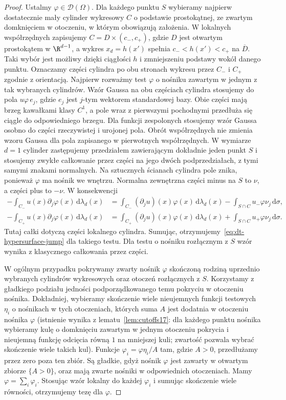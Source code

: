 \begin{proof}
Ustalmy $\varphi\in\mathcal D(\Omega)$.
Dla każdego punktu $S$ wybieramy najpierw
dostatecznie mały cylinder wykresowy $C$
o podstawie prostokątnej, ze zwartym domknięciem
w otoczeniu, w którym obowiązują założenia.
W lokalnych współrzędnych zapisujemy
$C=D\times(c_-,c_+)$, gdzie $D$ jest otwartym
prostokątem w $\R^{d-1}$, a wykres $x_d=h(x')$
spełnia $c_-<h(x')<c_+$ na $\overline D$.
Taki wybór jest możliwy dzięki ciągłości $h$
i zmniejszeniu podstawy wokół danego punktu.
Oznaczamy części cylindra po obu stronach
wykresu przez $C_-$ i $C_+$ zgodnie z orientacją.
Najpierw rozważmy test $\varphi$ o nośniku
zawartym w jednym z tak wybranych cylindrów.
Wzór Gaussa na obu częściach cylindra stosujemy
do pola $u\varphi\,e_j$, gdzie $e_j$ jest $j$-tym
wektorem standardowej bazy. Obie części mają
brzeg kawałkami klasy $C^1$, a pole wraz z pierwszymi
pochodnymi przedłuża się ciągle do odpowiedniego brzegu.
Dla funkcji zespolonych stosujemy wzór Gaussa osobno
do części rzeczywistej i urojonej pola.
Obrót współrzędnych nie zmienia wzoru Gaussa
dla pola zapisanego w pierwotnych współrzędnych.
W wymiarze $d=1$ cylinder zastępujemy przedziałem
zawierającym dokładnie jeden punkt $S$ i stosujemy
zwykłe całkowanie przez części na jego dwóch
podprzedziałach, z tymi samymi znakami normalnych.
Na sztucznych ścianach cylindra pole znika,
ponieważ $\varphi$ ma nośnik we wnętrzu.
Normalna zewnętrzna części minus na $S$ to $\nu$,
a części plus to $-\nu$. W konsekwencji
\[
 \begin{aligned}
 -\int_{C_-}u(x)\partial_j\varphi(x)\,\mathrm d\lambda_d(x)
 &=\int_{C_-}(\partial_ju)(x)\varphi(x)\,\mathrm d\lambda_d(x)
   -\int_{S\cap C} u_-\varphi\nu_j\,\mathrm d\sigma,\\
 -\int_{C_+}u(x)\partial_j\varphi(x)\,\mathrm d\lambda_d(x)
 &=\int_{C_+}(\partial_ju)(x)\varphi(x)\,\mathrm d\lambda_d(x)
   +\int_{S\cap C} u_+\varphi\nu_j\,\mathrm d\sigma.
 \end{aligned}
\]
Tutaj całki dotyczą części lokalnego cylindra.
Sumując, otrzymujemy~\eqref{eq:dt-hypersurface-jump} dla takiego
testu. Dla testu o nośniku rozłącznym z $S$ wzór
wynika z klasycznego całkowania przez części.

W ogólnym przypadku pokrywamy zwarty nośnik
$\varphi$ skończoną rodziną uprzednio wybranych
cylindrów wykresowych oraz otoczeń rozłącznych
z $S$. Korzystamy z gładkiego
podziału jedności podporządkowanego temu pokryciu
w otoczeniu nośnika. Dokładniej, wybieramy skończenie
wiele nieujemnych funkcji testowych $\eta_i$
o nośnikach w tych otoczeniach, których suma $A$
jest dodatnia w otoczeniu nośnika $\varphi$
(istnienie wynika z lematu~\ref{lem:cutoffs17}:
dla każdego punktu nośnika wybieramy kulę o domknięciu
zawartym w jednym otoczeniu pokrycia i nieujemną funkcję
odcięcia równą $1$ na mniejszej kuli; zwartość pozwala
wybrać skończenie wiele takich kul).
Funkcje $\varphi_i=\varphi\eta_i/A$ tam, gdzie $A>0$,
przedłużamy przez zero poza ten zbiór.
Są gładkie, gdyż nośnik $\varphi$ jest zawarty
w otwartym zbiorze $\{A>0\}$, oraz mają zwarte
nośniki w odpowiednich otoczeniach.
Mamy $\varphi=\sum_i\varphi_i$. Stosując wzór
lokalny do każdej $\varphi_i$ i sumując skończenie
wiele równości, otrzymujemy tezę dla $\varphi$.
\end{proof}


